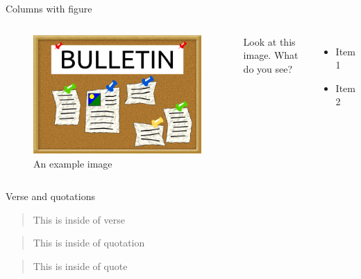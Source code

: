 \begin{frame}{Columns with figure}
  \begin{columns}
      \begin{figure}
        \includegraphics[width=\textwidth]{example.png}
        \caption[my caption]{An example image}
      \end{figure}
      Look at this image. What do you see?
      \begin{itemize}
       \item Item 1
       \item Item 2
      \end{itemize}
  \end{columns}
\end{frame}


\begin{frame}{Verse and quotations}
  \begin{verse}
    This is inside of verse
  \end{verse}
  \begin{quotation}
    This is inside of quotation
  \end{quotation}
  \begin{quote}
    This is inside of quote
  \end{quote}
\end{frame}


